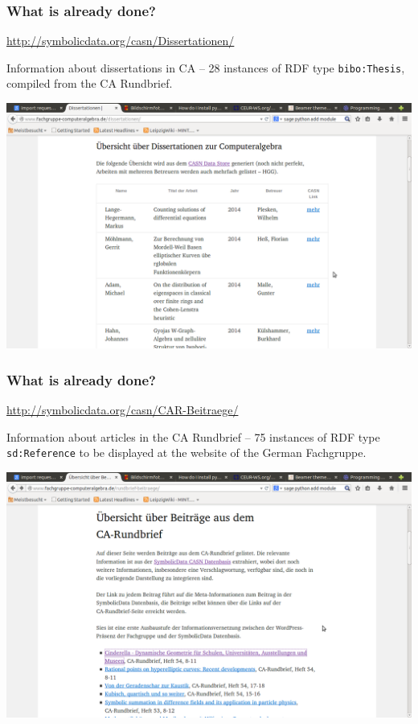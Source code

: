 \documentclass{beamer}
\begin{document}
\begin{frame}\frametitle{What is already done?}\small

  \begin{center}
    \url{http://symbolicdata.org/casn/Dissertationen/}
  \end{center}

Information about dissertations in CA -- 28 instances of RDF type
\texttt{bibo:Thesis}, compiled from the CA Rundbrief.

\begin{center}
  \includegraphics[width=.8\textwidth]{cicm-14/Dissertationen.png}
\end{center}
\end{frame}

\begin{frame}\frametitle{What is already done?}\small

  \begin{center}
    \url{http://symbolicdata.org/casn/CAR-Beitraege/}
  \end{center}

Information about articles in the CA Rundbrief -- 75 instances of RDF type
\texttt{sd:Reference} to be displayed at the website of the German Fachgruppe. 

\begin{center}
  \includegraphics[width=.8\textwidth]{cicm-14/Rundbrief.png}
\end{center}
\end{frame}
\end{document}
